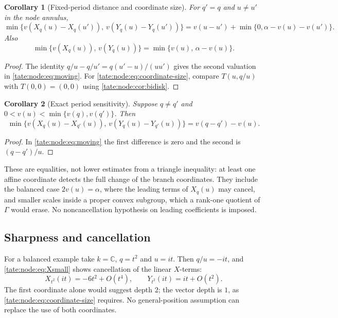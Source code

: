 \documentclass[11pt,letterpaper]{article}
\newtheorem{corollary}[corollary]{Corollary}
\theoremstyle{definition}
\newcommand{\C}{\mathbb C}
\begin{document}
\begin{corollary}[Fixed-period distance and coordinate size]\label{tate:node:cor:fixedmetric}
For $q'=q$ and $u\ne u'$ in the node annulus,
\begin{equation}
 \min\{v(X_q(u)-X_q(u')),\,v(Y_q(u)-Y_q(u'))\}
 =v(u-u')+\min\{0,\alpha-v(u)-v(u')\}.\label{tate:node:eq:fixeddistance}
\end{equation}
Also
\begin{equation}
 \min\{v(X_q(u)),\,v(Y_q(u))\}=\min\{v(u),\,\alpha-v(u)\}.
 \label{tate:node:eq:coordinate-size}
\end{equation}
\end{corollary}

\begin{proof}
The identity $q/u-q/u'=q(u'-u)/(uu')$ gives the second valuation in
\eqref{tate:node:eq:moving}. For \eqref{tate:node:eq:coordinate-size},
compare $T(u,q/u)$ with $T(0,0)=(0,0)$ using \cref{tate:node:cor:bidisk}.
\end{proof}

\begin{corollary}[Exact period sensitivity]\label{tate:node:cor:periodsensitivity}
Suppose $q\ne q'$ and $0<v(u)<\min\{v(q),v(q')\}$. Then
\begin{equation}
 \min\{v(X_q(u)-X_{q'}(u)),\,v(Y_q(u)-Y_{q'}(u))\}=v(q-q')-v(u).
 \label{tate:node:eq:sensitivity}
\end{equation}
\end{corollary}

\begin{proof}
In \eqref{tate:node:eq:moving} the first difference is zero and the second
is $(q-q')/u$.
\end{proof}

These are equalities, not lower estimates from a triangle inequality: at
least one affine coordinate detects the full change of the branch
coordinates. They include the balanced case $2v(u)=\alpha$, where the
leading terms of $X_q(u)$ may cancel, and smaller scales inside a proper
convex subgroup, which a rank-one quotient of $\Gamma$ would erase. No
noncancellation hypothesis on leading coefficients is imposed.

\subsection{Sharpness and cancellation}

For a balanced example take $k=\C$, $q=t^2$ and $u=it$. Then $q/u=-it$, and
\eqref{tate:node:eq:Xsmall} shows cancellation of the linear $X$-terms:
\[
 X_{t^2}(it)=-6t^2+O(t^4),\qquad Y_{t^2}(it)=it+O(t^2).
\]
The first coordinate alone would suggest depth $2$; the vector depth is $1$,
as \eqref{tate:node:eq:coordinate-size} requires. No general-position
assumption can replace the use of both coordinates.
\end{document}
